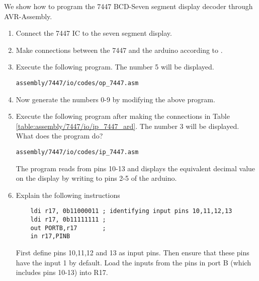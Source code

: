 We show how to program the 7447 BCD-Seven segment
display decoder through AVR-Assembly.
%
\begin{enumerate}[label=\arabic*.,ref=\theenumi]
\item Connect the 7447 IC to the seven segment display.
\item Make connections between the 7447 and the arduino according to 
.
\item Execute the following program.  The number 5 will be displayed.
\begin{lstlisting}
assembly/7447/io/codes/op_7447.asm
\end{lstlisting}
\item Now generate the numbers 0-9 by modifying the above program.
%
\item Execute the following program after making the connections in Table \ref{table:assembly/7447/io/ip_7447_ard}.  The number 3 will be displayed. What does the program do?
\begin{lstlisting}
assembly/7447/io/codes/ip_7447.asm
\end{lstlisting}
%
\begin{table}[H]
\centering

\caption{}
\label{table:assembly/7447/io/ip_7447_ard}
\end{table}
\solution The program reads from pins 10-13 and displays the equivalent decimal value on the display by writing to pins 2-5 of the arduino.
\item Explain the following instructions
\begin{lstlisting}
	ldi r17, 0b11000011 ; identifying input pins 10,11,12,13
	ldi r17, 0b11111111 ;
	out PORTB,r17		; 
	in r17,PINB
\end{lstlisting}
\solution First define pins 10,11,12 and 13 as input pins. Then ensure that these pins have the input 1 by default. Load the inputs from the pins in port B (which includes pins 10-13) into R17.
\end{enumerate}



